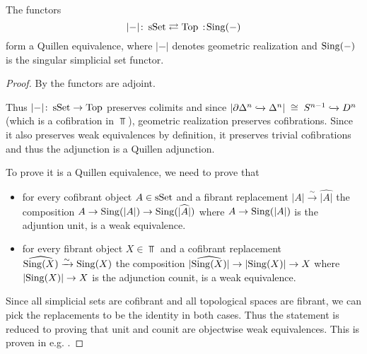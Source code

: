\begin{prop}\label{prop:quillenEqSSetTop}
    The functors
    \begin{equation*}
        \lvert-\rvert\colon\sSet\rightleftarrows\Top\mkern+3mu:\mkern-3mu\Sing(-)
    \end{equation*}
    form a Quillen equivalence, where $\lvert-\rvert$ denotes geometric realization and $\operatorname{Sing}(-)$ is the singular simplicial set functor.
    \begin{proof}
        By \cite[Corollary 1.1.8.5]{kerodon} the functors are adjoint.

        Thus $\lvert-\rvert\colon\operatorname{sSet}\to\operatorname{Top}$ preserves colimits and since $\lvert\partial\Delta^n\xhookrightarrow{}\Delta^n\rvert\;\cong\;S^{n-1}\xhookrightarrow{} D^n$ (which is a cofibration in $\Top$), geometric realization preserves cofibrations.
        Since it also preserves weak equivalences by definition, it preserves trivial cofibrations and thus the adjunction is a Quillen adjunction.

        To prove it is a Quillen equivalence, we need to prove that 
        \begin{itemize}
            \item for every cofibrant object $A\in\operatorname{sSet}$ and a fibrant replacement $\lvert A\rvert\xrightarrow{\sim}\widehat{\lvert A\rvert}$ the composition $A\to\operatorname{Sing}(\lvert A\rvert)\to\operatorname{Sing}(\widehat{\lvert A\rvert})$ where $A\to\operatorname{Sing}(\lvert A\rvert)$ is the adjuntion unit, is a weak equivalence.
            \item for every fibrant object $X\in\Top$ and a cofibrant replacement $\widehat{\operatorname{Sing}(X)}\xrightarrow{\sim}\operatorname{Sing}(X)$ the composition $\lvert\widehat{\operatorname{Sing}(X)}\rvert\to\lvert\operatorname{Sing}(X)\rvert\to X$ where $\lvert\operatorname{Sing}(X)\rvert\to X$ is the adjunction counit, is a weak equivalence.
        \end{itemize}
        Since all simplicial sets are cofibrant and all topological spaces are fibrant, we can pick the replacements to be the identity in both cases.
        Thus the statement is reduced to proving that unit and counit are objectwise weak equivalences. 
        This is proven in e.g. \cite[Theorem 3.5.4.1 and Corollary 3.5.4.2]{kerodon}.
    \end{proof}
\end{prop}
